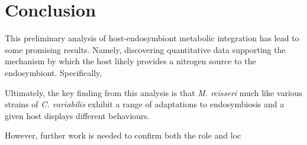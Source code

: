 \section{Conclusion}

This preliminary analysis of host-endosymbiont metabolic integration 
has lead to some promising results.
Namely, discovering quantitative data supporting the mechanism by which
the host likely provides a nitrogen source to the endosymbiont. 
Specifically, 





Ultimately, the key finding from this analysis
is that \textit{M. reisseri} much like various strains of \textit{C. variabilis}
exhibit a range of adaptations to endosymbiosis and a given
host displays different behaviours. 







However, further work is needed to confirm both the role and loc

%

%
%
%
%
%
%
%
%


